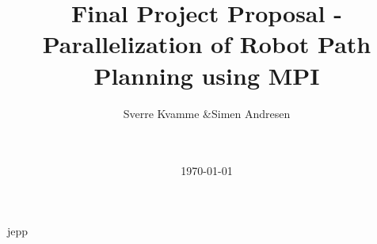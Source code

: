 



\title{Final Project Proposal - Parallelization of Robot Path Planning using MPI}
\author{Sverre Kvamme \&Simen Andresen}
\date{\ \\ \ \\ \today}




\maketitle


\pagestyle{fancy}
\lhead{}
\rhead{\thepage}
\setcounter{page}{1}

\rhead{\thepage}
\cfoot{}
jepp

%



